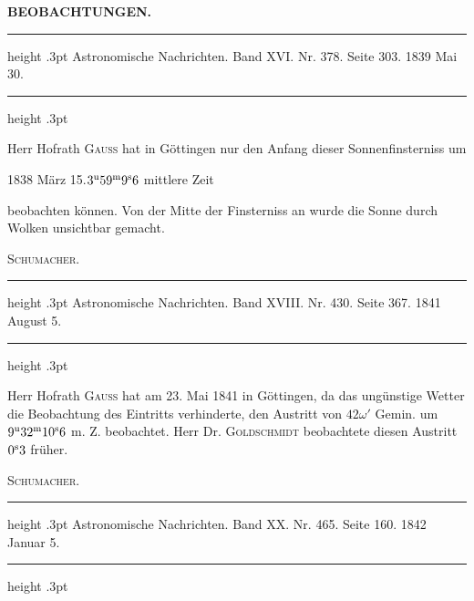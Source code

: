 \clearpage
\thispagestyle{empty}
\noindent{}%
%
\parbox[t]{\dimexpr\linewidth-24mm\relax}{\centering\footnotesize\bfseries BEOBACHTUNGEN.\par}%
\makebox[12mm][r]{}\par\nobreak\medskip
\begin{center}
\parbox{.78\linewidth}{%
\centering\small
\hrule height .3pt\relax\vspace{2.5pt}
Astronomische Nachrichten. Band XVI. Nr. 378. Seite 303. 1839 Mai 30.\par
\vspace{2.5pt}\hrule height .3pt\relax
}
\end{center}

Herr Hofrath \textsc{Gauss} hat in Göttingen nur den Anfang dieser Sonnenfinsterniss um
\begin{center}1838 März 15.\quad $3^{\rm u}59^{\rm m}9^{\rm s}6$ mittlere Zeit\end{center}
\noindent beobachten können. Von der Mitte der Finsterniss an wurde die Sonne durch Wolken unsichtbar gemacht.
\begin{flushright}\textsc{Schumacher.}\end{flushright}

\par\bigskip
{}
\hypertarget{native-469-occultation}{}
\begin{center}
\parbox{.78\linewidth}{%
\centering\small
\hrule height .3pt\relax\vspace{2.5pt}
Astronomische Nachrichten. Band XVIII. Nr. 430. Seite 367. 1841 August 5.\par
\vspace{2.5pt}\hrule height .3pt\relax
}
\end{center}

Herr Hofrath \textsc{Gauss} hat am 23. Mai 1841 in Göttingen, da das ungünstige Wetter die Beobachtung des Eintritts verhinderte, den Austritt von $42\omega'$ Gemin. um $9^{\rm u}32^{\rm m}10^{\rm s}6$ m. Z. beobachtet. Herr Dr. \textsc{Goldschmidt} beobachtete diesen Austritt $0^{\rm s}3$ früher.
\begin{flushright}\textsc{Schumacher.}\end{flushright}

\par\bigskip
{}
\hypertarget{native-469-notice1842}{}
\begin{center}
\parbox{.78\linewidth}{%
\centering\small
\hrule height .3pt\relax\vspace{2.5pt}
Astronomische Nachrichten. Band XX. Nr. 465. Seite 160. 1842 Januar 5.\par
\vspace{2.5pt}\hrule height .3pt\relax
}
\end{center}

